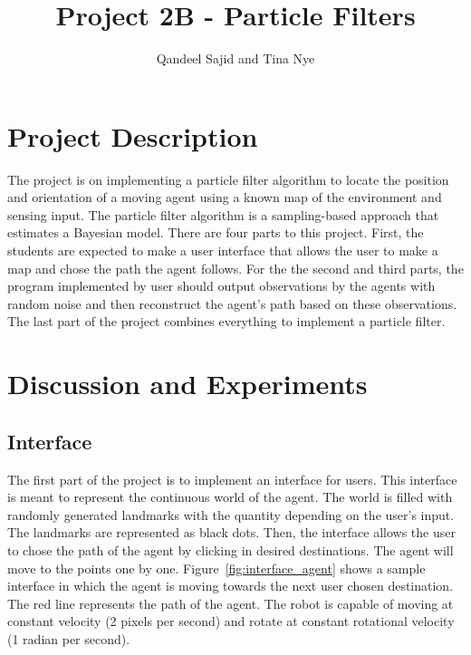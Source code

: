 \documentclass[a4paper,11pt]{report}
\title{Project 2B - Particle Filters}
\author{Qandeel Sajid and Tina Nye}
\begin{document}
\maketitle

\newpage
\tableofcontents
\newpage

\section{Project Description}

The project is on implementing a particle filter algorithm to locate the position and orientation of a moving agent using a known map of the environment and sensing input. The particle filter algorithm is a sampling-based approach that estimates a Bayesian model. There are four parts to this project. First, the students are expected to make a user interface that allows the user to make a map and chose the path the agent follows. For the the second and third parts, the program implemented by user should output observations by the agents with random noise and then reconstruct the agent's path based on these observations. The last part of the project combines everything to implement a particle filter.

\section{Discussion and Experiments}
	\subsection{Interface}
	The first part of the project is to implement an interface for users. This interface is meant to represent the continuous world of the agent. The world is filled with randomly generated landmarks with the quantity depending on the user's input. The landmarks are represented as black dots. Then, the interface allows the user to chose the path of the agent by clicking in desired destinations. The agent will move to the points one by one. Figure~\ref{fig:interface_agent} shows a sample interface in which the agent is moving towards the next user chosen destination. The red line represents the path of the agent. The robot is capable of moving at constant velocity (2 pixels per second) and rotate at constant rotational velocity (1 radian per second).
	
\end{document}

